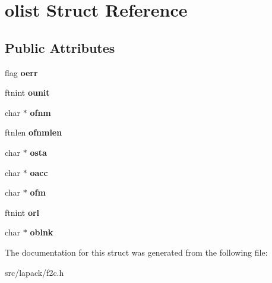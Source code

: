 \hypertarget{structolist}{\section{olist \-Struct \-Reference}
\label{structolist}
}
\subsection*{\-Public \-Attributes}
\begin{DoxyCompactItemize}
\item 
\hypertarget{structolist_acb7f3c45380f7965c9ab177c228ed936}{flag {\bfseries oerr}}\label{structolist_acb7f3c45380f7965c9ab177c228ed936}

\item 
\hypertarget{structolist_af4443a6a577bfe9292cbf741c24c6e79}{ftnint {\bfseries ounit}}\label{structolist_af4443a6a577bfe9292cbf741c24c6e79}

\item 
\hypertarget{structolist_a6af6060865be898dfc66c0fd6630d545}{char $\ast$ {\bfseries ofnm}}\label{structolist_a6af6060865be898dfc66c0fd6630d545}

\item 
\hypertarget{structolist_a497ca7ef9c2e42d5cd30c847fdbd3f10}{ftnlen {\bfseries ofnmlen}}\label{structolist_a497ca7ef9c2e42d5cd30c847fdbd3f10}

\item 
\hypertarget{structolist_a2cf08ac4e1e2fc9e6f21299df3f1d2e6}{char $\ast$ {\bfseries osta}}\label{structolist_a2cf08ac4e1e2fc9e6f21299df3f1d2e6}

\item 
\hypertarget{structolist_ad27927ac817bff0dbfa00d07f3e3e2d2}{char $\ast$ {\bfseries oacc}}\label{structolist_ad27927ac817bff0dbfa00d07f3e3e2d2}

\item 
\hypertarget{structolist_abe3c8fd2be6dc58be3157e2e0f48cf6a}{char $\ast$ {\bfseries ofm}}\label{structolist_abe3c8fd2be6dc58be3157e2e0f48cf6a}

\item 
\hypertarget{structolist_a4c83b168f7afdd6c81a7843193c5755e}{ftnint {\bfseries orl}}\label{structolist_a4c83b168f7afdd6c81a7843193c5755e}

\item 
\hypertarget{structolist_a6b914b4f6d4df1f377d40c964bd71625}{char $\ast$ {\bfseries oblnk}}\label{structolist_a6b914b4f6d4df1f377d40c964bd71625}

\end{DoxyCompactItemize}


\-The documentation for this struct was generated from the following file\-:\begin{DoxyCompactItemize}
\item 
src/lapack/f2c.\-h\end{DoxyCompactItemize}
